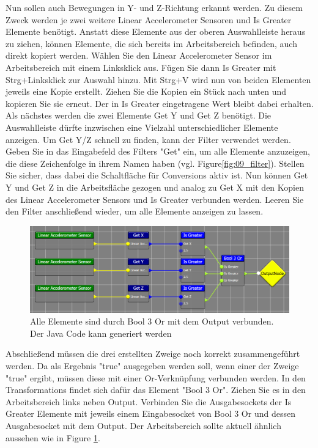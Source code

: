 Nun sollen auch Bewegungen in Y- und Z-Richtung erkannt werden. Zu diesem Zweck werden je zwei weitere Linear Accelerometer Sensoren und Is Greater Elemente ben\"otigt.
Anstatt diese Elemente aus der oberen Auswahlleiste heraus zu ziehen, k\"onnen Elemente, die sich bereits im Arbeitsbereich befinden, auch direkt kopiert werden. 
W\"ahlen Sie den Linear Accelerometer Sensor im Arbeitsbereich mit einem Linksklick aus. F\"ugen Sie dann Is Greater mit Strg+Linksklick zur Auswahl hinzu. Mit Strg+V wird nun von beiden Elementen jeweils eine Kopie erstellt. Ziehen Sie die Kopien ein St\"uck nach unten und kopieren Sie sie erneut. Der in Is Greater eingetragene Wert bleibt dabei erhalten.
Als n\"achstes werden die zwei Elemente Get Y und Get Z ben\"otigt. Die Auswahlleiste d\"urfte inzwischen eine Vielzahl unterschiedlicher Elemente anzeigen. Um Get Y/Z schnell zu finden, kann der Filter verwendet werden. Geben Sie in das Eingabefeld des Filters "Get" ein, um alle Elemente anzuzeigen, die diese Zeichenfolge in ihrem Namen haben (vgl. Figure\ref{fig:09_filter}). Stellen Sie sicher, dass dabei die Schaltfl\"ache f\"ur Conversions aktiv ist. Nun k\"onnen Get Y und Get Z in die Arbeitsfl\"ache gezogen und analog zu Get X mit den Kopien des Linear Accelerometer Sensors und Is Greater verbunden werden. Leeren Sie den Filter anschlie{\ss}end wieder, um alle Elemente anzeigen zu lassen.
\\

\begin{figure}[h!]
	\centering
		\includegraphics[width = \textwidth]{Manual/10_first_test}
	\caption{Alle Elemente sind durch Bool 3 Or mit dem Output verbunden. Der Java Code kann generiert werden}
	\label{fig:10_first_test}
\end{figure}

Abschlie{\ss}end m\"ussen die drei erstellten Zweige noch korrekt zusammengef\"uhrt werden. Da als Ergebnis "true" ausgegeben werden soll, wenn einer der Zweige "true" ergibt, m\"ussen diese mit einer Or-Verkn\"upfung verbunden werden. In den Transformations findet sich daf\"ur das Element "Bool 3 Or". Ziehen Sie es in den Arbeitsbereich links neben Output.
Verbinden Sie die Ausgabesockets der Is Greater Elemente mit jeweils einem Eingabesocket von Bool 3 Or und dessen Ausgabesocket mit dem Output. Der Arbeitsbereich sollte aktuell \"ahnlich aussehen wie in Figure \ref{fig:10_first_test}.

